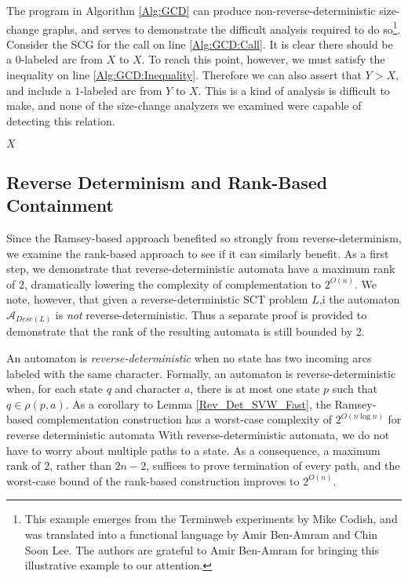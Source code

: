 \documentclass{LMCS}
\newcommand{\A}{{\mathcal A}}
\begin{document}
The program in Algorithm \ref{Alg:GCD} can produce non-reverse-deterministic
size-change graphs, and serves to demonstrate the difficult analysis required to
do so\footnote{This example emerges from the Terminweb experiments by Mike
Codish, and was translated into a functional language by Amir Ben-Amram and Chin
Soon Lee. The authors are grateful to Amir Ben-Amram for bringing this
illustrative example to our attention.}.  Consider the SCG for the call on line
\ref{Alg:GCD:Call}. It is clear there should be a $0$-labeled arc from $X$ to
$X$. To reach this point, however, we must satisfy the inequality on line
\ref{Alg:GCD:Inequality}. Therefore we can also assert that $Y>X$, and include a
$1$-labeled arc from $Y$ to $X$. This is a kind of analysis is difficult to
make, and none of the size-change analyzers we examined were capable of
detecting this relation.


\LinesNumbered
{}
\begin{algorithm}[tp]
\DontPrintSemicolon
\caption{}
\label{Alg:GCD}
  {
     \label{Alg:GCD:Call}\;
  }
  {
     \;
  }
  \lElse
  {
     \Return $X$
  }
\end{algorithm}



\subsection{Reverse Determinism and Rank-Based Containment}

Since the Ramsey-based approach benefited so strongly from reverse-determinism,
we examine the rank-based approach to see if it can similarly benefit.  As a
first step, we demonstrate that reverse-deterministic automata have a maximum
rank of 2, dramatically lowering the complexity of complementation to $2^{O(n)}$. We note, however,
that given a reverse-deterministic SCT problem $L$,i the automaton $\A_{Desc(L)}$ is \emph{not}
reverse-deterministic.  Thus a separate proof is provided to demonstrate that the rank of the
resulting automata is still bounded by 2. 

An automaton is \emph{reverse-deterministic} when no state has two incoming arcs
labeled with the same character. Formally, an automaton is reverse-deterministic
when, for each state $q$ and character $a$, there is at most one state $p$ such
that $q \in \rho(p,a)$. As a corollary to Lemma \ref{Rev_Det_SVW_Fast}, the
Ramsey-based complementation construction has a worst-case complexity of
$2^{O(n\log n)}$ for reverse deterministic automata With reverse-deterministic automata, we do not
have to worry about multiple paths to a state. As a consequence, a maximum rank of 2, rather than
$2n-2$, suffices to prove termination of every path, and the worst-case bound of the rank-based
construction improves to $2^{O(n)}$.
\end{document}
